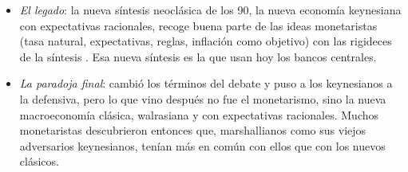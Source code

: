 \documentclass[11pt]{article}
\begin{document}
\begin{itemize}
\begin{itemize}
  \item \emph{la renta permanente} no se observa, y es difícil de contrastar;
  \item \emph{las expectativas adaptativas} permiten errores sistemáticos: la nueva macroeconomía clásica las sustituye por las racionales de \textcite{Muth1961Rational} y llega a una conclusión aún más dura contra la estabilización\nocite{Lucas1972Expectations} .
  \end{itemize}
\item \emph{El legado}: la nueva síntesis neoclásica de los 90, la nueva economía keynesiana con expectativas racionales, recoge buena parte de las ideas monetaristas (tasa natural, expectativas, reglas, inflación como objetivo) con las rigideces de la síntesis\nocite{GoodfriendKing1997New} . Esa nueva síntesis es la que usan hoy los bancos centrales\nocite{Mankiw2006Macroeconomist}.
\item \emph{La paradoja final}:  cambió los términos del debate y puso a los keynesianos a la defensiva, pero lo que vino después no fue el monetarismo, sino la nueva macroeconomía clásica, walrasiana y con expectativas racionales. Muchos monetaristas descubrieron entonces que, marshallianos como sus viejos adversarios keynesianos, tenían más en común con ellos que con los nuevos clásicos\nocite{DeVroey2016History}.
\end{itemize}
\end{document}
